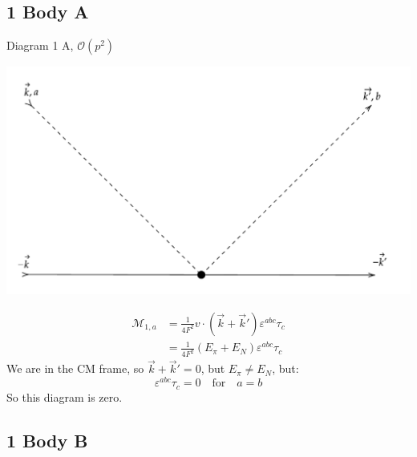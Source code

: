 \documentclass[11pt]{article}
\newcommand\mo{\mathcal{O}}
\newcommand\mm{\mathcal{M}}
\begin{document}
\subsection{1 Body A}
Diagram 1 A, $\mo(p^2)$
\begin{center}
    \includegraphics[scale=0.65]{1a.pdf}
\end{center}
\begin{align}
    \mm_{1,a}&= \frac{1}{4 F^2} v \cdot \left( \vec{k} +\vec{k}' \right) \varepsilon^{abc} \tau_c\\
             &= \frac{1}{4 F^2} (E_\pi+E_N)\varepsilon^{abc} \tau_c
\end{align}
We are in the CM frame, so $\vec{k}+\vec{k}'=0$, but $E_\pi\neq E_N$, but:
\begin{equation}
    \varepsilon^{abc} \tau_c= 0 \quad \text{for}\quad a=b   
\end{equation}
So this diagram is zero.
\newpage
\subsection{1 Body B}
\end{document}
